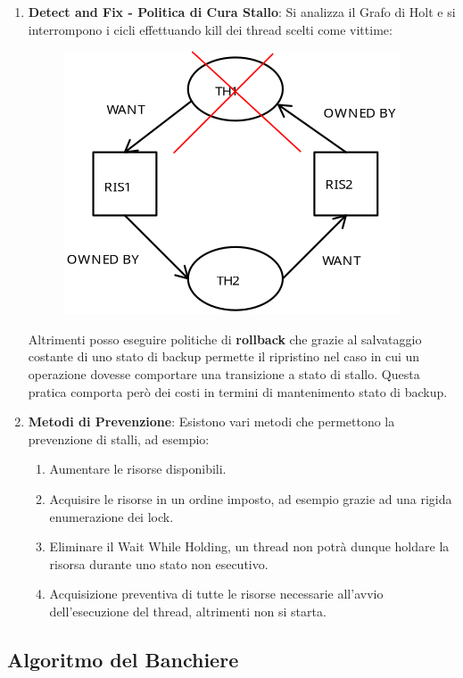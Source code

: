 \documentclass{article}
\begin{document}
\begin{enumerate}
    \item \textbf{Detect and Fix - Politica di Cura Stallo}: Si analizza il Grafo di Holt e si interrompono i cicli effettuando kill dei thread scelti come vittime:
    \begin{figure}[htbp]
        \center
        \includegraphics[scale=0.325]{img/kill_grafoHolt.png}
    \end{figure}
    Altrimenti posso eseguire politiche di \textbf{rollback} che grazie al salvataggio costante di uno stato di backup permette il ripristino nel caso in cui
    un operazione dovesse comportare una transizione a stato di stallo. Questa pratica comporta però dei costi in termini di mantenimento stato di backup.
    \newpage
    \item \textbf{Metodi di Prevenzione}: Esistono vari metodi che permettono la prevenzione di stalli, ad esempio:
    \begin{enumerate}
        \item Aumentare le risorse disponibili.
        \item Acquisire le risorse in un ordine imposto, ad esempio grazie ad una rigida enumerazione dei lock.
        \item Eliminare il Wait While Holding, un thread non potrà dunque holdare la risorsa durante uno stato non esecutivo.
        \item Acquisizione preventiva di tutte le risorse necessarie all'avvio dell'esecuzione del thread, altrimenti non si starta.
    \end{enumerate}
\end{enumerate}

\subsection{Algoritmo del Banchiere}
\end{document}
